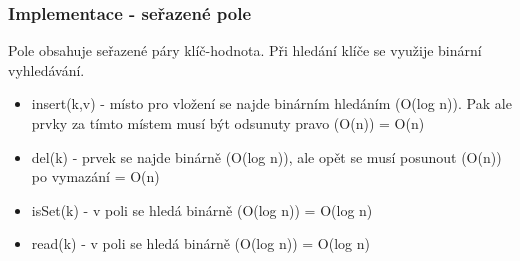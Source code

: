 \documentclass{szzclass}
\begin{document}
\subsubsection{Implementace - seřazené pole}
Pole obsahuje seřazené páry klíč-hodnota.
Při hledání klíče se využije binární vyhledávání.
\begin{itemize}
    \item insert(k,v) - místo pro vložení se najde binárním hledáním (O(log n)). Pak ale prvky za tímto místem musí být odsunuty pravo (O(n)) = O(n)
    \item del(k) - prvek se najde binárně (O(log n)), ale opět se musí posunout (O(n)) po vymazání = O(n)
    \item isSet(k) - v poli se hledá binárně (O(log n)) = O(log n)
    \item read(k) - v poli se hledá binárně (O(log n)) = O(log n)
\end{itemize}
\end{document}

